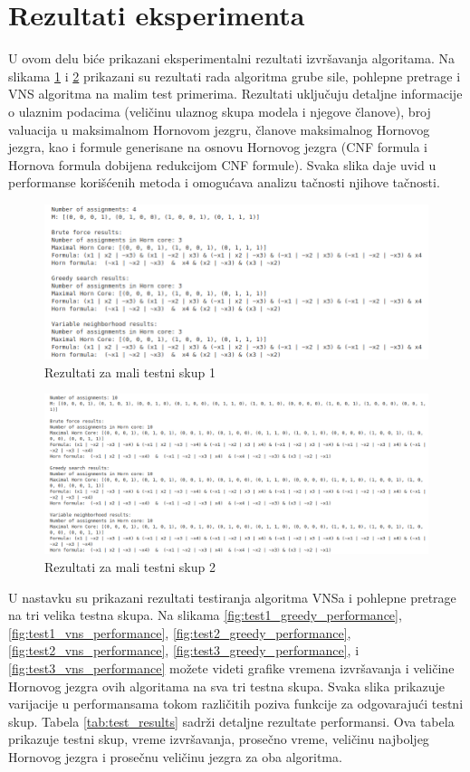 \documentclass[12pt,oneside]{memoir}
\begin{document}
\section{Rezultati eksperimenta}
U ovom delu biće prikazani eksperimentalni rezultati izvršavanja algoritama. Na slikama \ref{fig:slika1} i \ref{fig:slika2} prikazani su rezultati rada algoritma grube sile, pohlepne pretrage i VNS algoritma na malim test primerima. Rezultati uključuju detaljne informacije o ulaznim podacima (veličinu ulaznog skupa modela i njegove članove), broj valuacija u maksimalnom Hornovom jezgru, članove maksimalnog Hornovog jezgra, kao i formule generisane na osnovu Hornovog jezgra (CNF formula i Hornova formula dobijena redukcijom CNF formule). Svaka slika daje uvid u performanse korišćenih metoda i omogućava analizu tačnosti njihove tačnosti.

\begin{figure}[H]
    \centering
    \includegraphics[width=0.9\linewidth]{small_test_1.png}
    \caption{Rezultati za mali testni skup 1}
    \label{fig:slika1}
\end{figure}

\begin{figure}[H]
    \centering
    \includegraphics[width=0.9\linewidth]{small_test_2.png}
    \caption{Rezultati za mali testni skup 2}
    \label{fig:slika2}
\end{figure}

U nastavku su prikazani rezultati testiranja algoritma VNSa i pohlepne pretrage na tri velika testna skupa. Na slikama \ref{fig:test1_greedy_performance}, \ref{fig:test1_vns_performance}, \ref{fig:test2_greedy_performance}, \ref{fig:test2_vns_performance}, \ref{fig:test3_greedy_performance}, i \ref{fig:test3_vns_performance} možete videti grafike vremena izvršavanja i veličine Hornovog jezgra ovih algoritama na sva tri testna skupa. Svaka slika prikazuje varijacije u performansama tokom različitih poziva funkcije za odgovarajući testni skup. Tabela \ref{tab:test_results} sadrži detaljne rezultate performansi. Ova tabela prikazuje testni skup, vreme izvršavanja, prosečno vreme, veličinu najboljeg Hornovog jezgra i prosečnu veličinu jezgra za oba algoritma.
\end{document}
